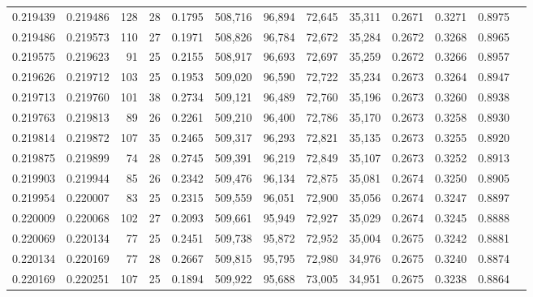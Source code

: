 \begin{tabular}{rrrrrrrrrrrrr}
0.219439 & 0.219486 & 128 &  28 &                                     0.1795 & 508,716 &  96,894 &  72,645 &  35,311 & 0.2671 & 0.3271 & 0.8975 \\
0.219486 & 0.219573 & 110 &  27 &                                     0.1971 & 508,826 &  96,784 &  72,672 &  35,284 & 0.2672 & 0.3268 & 0.8965 \\
0.219575 & 0.219623 &  91 &  25 &                                     0.2155 & 508,917 &  96,693 &  72,697 &  35,259 & 0.2672 & 0.3266 & 0.8957 \\
0.219626 & 0.219712 & 103 &  25 &                                     0.1953 & 509,020 &  96,590 &  72,722 &  35,234 & 0.2673 & 0.3264 & 0.8947 \\
0.219713 & 0.219760 & 101 &  38 &                                     0.2734 & 509,121 &  96,489 &  72,760 &  35,196 & 0.2673 & 0.3260 & 0.8938 \\
0.219763 & 0.219813 &  89 &  26 &                                     0.2261 & 509,210 &  96,400 &  72,786 &  35,170 & 0.2673 & 0.3258 & 0.8930 \\
0.219814 & 0.219872 & 107 &  35 &                                     0.2465 & 509,317 &  96,293 &  72,821 &  35,135 & 0.2673 & 0.3255 & 0.8920 \\
0.219875 & 0.219899 &  74 &  28 &                                     0.2745 & 509,391 &  96,219 &  72,849 &  35,107 & 0.2673 & 0.3252 & 0.8913 \\
0.219903 & 0.219944 &  85 &  26 &                                     0.2342 & 509,476 &  96,134 &  72,875 &  35,081 & 0.2674 & 0.3250 & 0.8905 \\
0.219954 & 0.220007 &  83 &  25 &                                     0.2315 & 509,559 &  96,051 &  72,900 &  35,056 & 0.2674 & 0.3247 & 0.8897 \\
0.220009 & 0.220068 & 102 &  27 &                                     0.2093 & 509,661 &  95,949 &  72,927 &  35,029 & 0.2674 & 0.3245 & 0.8888 \\
0.220069 & 0.220134 &  77 &  25 &                                     0.2451 & 509,738 &  95,872 &  72,952 &  35,004 & 0.2675 & 0.3242 & 0.8881 \\
0.220134 & 0.220169 &  77 &  28 &                                     0.2667 & 509,815 &  95,795 &  72,980 &  34,976 & 0.2675 & 0.3240 & 0.8874 \\
0.220169 & 0.220251 & 107 &  25 &                                     0.1894 & 509,922 &  95,688 &  73,005 &  34,951 & 0.2675 & 0.3238 & 0.8864 \\

\end{tabular}
